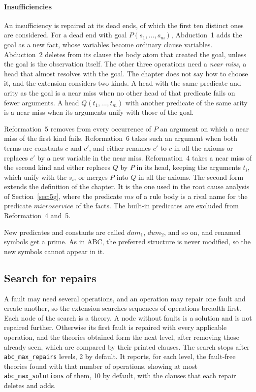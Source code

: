\documentclass[preprint,12pt]{elsarticle}
\newcommand{\isa}[1]{\texttt{#1}}
\begin{document}
\paragraph{Insufficiencies}
An insufficiency is repaired at its dead ends, of which the first ten
distinct ones are considered. For a dead end with goal $P(s_1,\dots,s_m)$,
Abduction~1 adds the goal as a new fact, whose variables become ordinary
clause variables. Abduction~2 deletes from its clause the body atom that
created the goal, unless the goal is the observation itself. The other
three operations need a \emph{near miss}, a head that almost resolves with
the goal. The chapter does not say how to choose it, and the extension
considers two kinds. A head with the same predicate and arity as the goal
is a near miss when no other head of that predicate fails on fewer
arguments. A head $Q(t_1,\dots,t_m)$ with another predicate of the same
arity is a near miss when its arguments unify with those of the goal.

Reformation~5 removes from every occurrence of $P$ an argument on which a
near miss of the first kind fails. Reformation~6 takes such an argument
when both terms are constants $c$ and $c'$, and either renames $c'$ to $c$
in all the axioms or replaces $c'$ by a new variable in the near miss.
Reformation~4 takes a near miss of the second kind and either replaces $Q$
by $P$ in its head, keeping the arguments $t_i$, which unify with the
$s_i$, or merges $P$ into $Q$ in all the axioms. The second form extends
the definition of the chapter. It is the one used in the root cause
analysis of Section~\ref{sec:5g}, where the predicate $\mathit{ms}$ of a
rule body is a rival name for the predicate $\mathit{microservice}$ of the
facts. The built-in predicates are excluded from Reformation~4 and~5.

New predicates and constants are called $\mathit{dum}_1$,
$\mathit{dum}_2$, and so on, and renamed symbols get a prime. As in ABC,
the preferred structure is never modified, so the new symbols cannot
appear in it.

\subsection{Search for repairs}
\label{sec:search}

A fault may need several operations, and an operation may repair one fault
and create another, so the extension searches sequences of operations
breadth first. Each node of the search is a theory. A node without faults
is a solution and is not repaired further. Otherwise its first fault is
repaired with every applicable operation, and the theories obtained form
the next level, after removing those already seen, which are compared by
their printed clauses. The search stops after \isa{abc\_max\_repairs}
levels, 2 by default. It reports, for each level, the fault-free theories
found with that number of operations, showing at most
\isa{abc\_max\_solutions} of them, 10 by default, with the clauses that
each repair deletes and adds.
\end{document}
